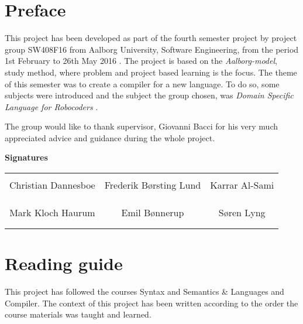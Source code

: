 \chapter*{Preface}
This project has been developed as part of the fourth semester project by project group SW408F16 from Aalborg University, Software Engineering, from the period 1st February to 26th May 2016 . \newline
The project is based on the \textit{Aalborg-model}, study method, where problem and project based learning is the focus. The theme of this semester was to create a compiler for a new language. To do so, some subjects were introduced and the subject the group chosen, was \textit{Domain Specific Language for Robocoders }. \newline

The group would like to thank supervisor, Giovanni Bacci for his very much appreciated advice and guidance during the whole project. 
\newline
\newline
\newline
\newline

{\Huge\textbf{Signatures}}
\newline
\newline

\begin{table}[H]
	\centering
		\begin{tabular}{c c c}
			\underline{\phantom{mmmmmmmmmmmmmm}} & \underline{\phantom{mmmmmmmmmmmmmm}} & \underline{\phantom{mmmmmmmmmmmmmm}} \\
			Christian Dannesboe			& Frederik Børsting Lund 		& Karrar Al-Sami 			\\
			&&\\
			&&\\
			\underline{\phantom{mmmmmmmmmmmmmm}} & \underline{\phantom{mmmmmmmmmmmmmm}} & \underline{\phantom{mmmmmmmmmmmmmm}} \\
			Mark Kloch Haurum			& Emil Bønnerup 		& Søren Lyng 				\\
			&&\\
			&&\\
		 																		
		\end{tabular}
\end{table}

\chapter*{Reading guide}
This project has followed the courses Syntax and Semantics \& Languages and Compiler. The context of this project has been written according to the order the course materials was taught and learned. \newline

